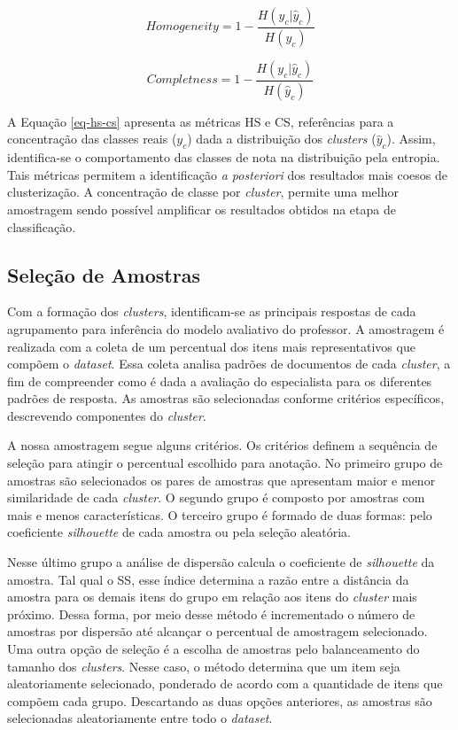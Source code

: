 \begin{equation}
Homogeneity = 1 - \frac{H(y_{c} | \hat{y}_{c})}{H(y_{c})}
\label{eq-hs-cs}
\end{equation}

\begin{equation*}
Completness = 1 - \frac{H(y_{c} | \hat{y}_{c})}{H(\hat{y}_{c})}
\end{equation*}

A Equação \ref{eq-hs-cs} apresenta as métricas HS e CS, referências para a concentração das classes reais ($y_{c}$) dada a distribuição dos \textit{clusters} ($\hat{y}_{c}$). Assim, identifica-se o comportamento das classes de nota na distribuição pela entropia. Tais métricas permitem a identificação \textit{a posteriori} dos resultados mais coesos de clusterização. A concentração de classe por \textit{cluster}, permite uma melhor amostragem sendo possível amplificar os resultados obtidos na etapa de classificação.


\subsection{Seleção de Amostras}
\label{subsec-selecao-amostras}

Com a formação dos \textit{clusters}, identificam-se as principais respostas de cada agrupamento para inferência do modelo avaliativo do professor. A amostragem é realizada com a coleta de um percentual dos itens mais representativos que compõem o \textit{dataset}. Essa coleta analisa padrões de documentos de cada \textit{cluster}, a fim de compreender como é dada a avaliação do especialista para os diferentes padrões de resposta. As amostras são selecionadas conforme critérios específicos, descrevendo componentes do \textit{cluster}. 

A nossa amostragem segue alguns critérios. Os critérios definem a sequência de seleção para atingir o percentual escolhido para anotação. No primeiro grupo de amostras são selecionados os pares de amostras que apresentam maior e menor similaridade de cada \textit{cluster}. O segundo grupo é composto por amostras com mais e menos características. O terceiro grupo é formado de duas formas: pelo coeficiente \textit{silhouette} \cite{rousseeuw1987} de cada amostra ou pela seleção aleatória.

Nesse último grupo a análise de dispersão calcula o coeficiente de \textit{silhouette} da amostra. Tal qual o SS, esse índice determina a razão entre a distância da amostra para os demais itens do grupo em relação aos itens do \textit{cluster} mais próximo. Dessa forma, por meio desse método é incrementado o número de amostras por dispersão até alcançar o percentual de amostragem selecionado. Uma outra opção de seleção é a escolha de amostras pelo balanceamento do tamanho dos \textit{clusters}. Nesse caso, o método determina que um item seja aleatoriamente selecionado, ponderado de acordo com a quantidade de itens que compõem cada grupo. Descartando as duas opções anteriores, as amostras são selecionadas aleatoriamente entre todo o \textit{dataset}.

